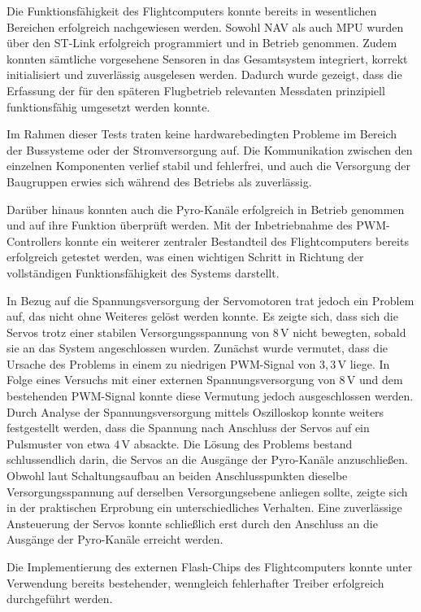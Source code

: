 Die Funktionsfähigkeit des Flightcomputers konnte bereits in wesentlichen Bereichen erfolgreich nachgewiesen werden. Sowohl NAV als auch MPU wurden über den ST-Link erfolgreich programmiert und in Betrieb genommen. Zudem konnten sämtliche vorgesehene Sensoren in das Gesamtsystem integriert, korrekt initialisiert und zuverlässig ausgelesen werden. Dadurch wurde gezeigt, dass die Erfassung der für den späteren Flugbetrieb relevanten Messdaten prinzipiell funktionsfähig umgesetzt werden konnte.

Im Rahmen dieser Tests traten keine hardwarebedingten Probleme im Bereich der Bussysteme oder der Stromversorgung auf. Die Kommunikation zwischen den einzelnen Komponenten verlief stabil und fehlerfrei, und auch die Versorgung der Baugruppen erwies sich während des Betriebs als zuverlässig.

Darüber hinaus konnten auch die Pyro-Kanäle erfolgreich in Betrieb genommen und auf ihre Funktion überprüft werden. Mit der Inbetriebnahme des PWM-Controllers konnte ein weiterer zentraler Bestandteil des Flightcomputers bereits erfolgreich getestet werden, was einen wichtigen Schritt in Richtung der vollständigen Funktionsfähigkeit des Systems darstellt.

In Bezug auf die Spannungsversorgung der Servomotoren trat jedoch ein Problem auf, das nicht ohne Weiteres gelöst werden konnte. Es zeigte sich, dass sich die Servos trotz einer stabilen Versorgungsspannung von $8\,\si{\volt}$ nicht bewegten, sobald sie an das System angeschlossen wurden. Zunächst wurde vermutet, dass die Ursache des Problems in einem zu niedrigen PWM-Signal von $3{,}3\,\si{\volt}$ liege. In Folge eines Versuchs mit einer externen Spannungsversorgung von $8\,\si{\volt}$ und dem bestehenden PWM-Signal konnte diese Vermutung jedoch ausgeschlossen werden. Durch Analyse der Spannungsversorgung mittels Oszilloskop konnte weiters festgestellt werden, dass die Spannung nach Anschluss der Servos auf ein Pulsmuster von etwa $4\,\si{\volt}$ absackte. Die Lösung des Problems bestand schlussendlich darin, die Servos an die Ausgänge der Pyro-Kanäle anzuschließen. Obwohl laut Schaltungsaufbau an beiden Anschlusspunkten dieselbe Versorgungsspannung auf derselben Versorgungsebene anliegen sollte, zeigte sich in der praktischen Erprobung ein unterschiedliches Verhalten. Eine zuverlässige Ansteuerung der Servos konnte schließlich erst durch den Anschluss an die Ausgänge der Pyro-Kanäle erreicht werden.

Die Implementierung des externen Flash-Chips des Flightcomputers konnte unter Verwendung bereits bestehender, wenngleich fehlerhafter Treiber erfolgreich durchgeführt werden.

